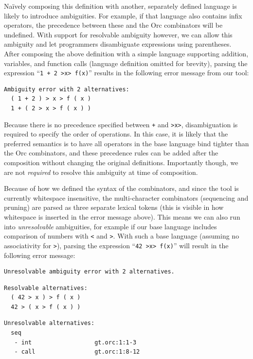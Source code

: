 \documentclass[acmsmall,review,anonymous]{acmart}\settopmatter{printfolios=true,printccs=false,printacmref=false}
\newcommand{\ocaml}{\lstinline[language={[objective]caml}]}
\begin{document}
\noindent
Na\"{i}vely composing this definition with another, separately
defined language is likely to introduce ambiguities. For example,
if that language also contains infix operators, the precedence
between these and the Orc combinators will be undefined. With
support for resolvable ambiguity however, we can allow this
ambiguity and let programmers disambiguate expressions using
parentheses. After composing the above definition with a simple
language supporting addition, variables, and function calls
(language definition omitted for brevity), parsing the expression
%
``\ocaml{1 + 2 >x> f(x)}''
%
results in the following error message from our tool:

{\small
\begin{lstlisting}[language={[objective]caml}]
Ambiguity error with 2 alternatives:
  ( 1 + 2 ) > x > f ( x )
  1 + ( 2 > x > f ( x ) )
\end{lstlisting}
}

\noindent
Because there is no precedence specified between \ocaml{+} and
\ocaml{>x>}, disambiguation is required to specify the order of
operations.
%
In this case, it is likely that the preferred semantics is to have
all operators in the base language bind tighter than the Orc
combinators, and these precedence rules can be added after the
composition without changing the original definitions. Importantly
though, we are not \emph{required} to resolve this ambiguity at
time of composition.

Because of how we defined the syntax of the combinators, and since
the tool is currently whitespace insensitive, the
multi-character combinators (sequencing and pruning) are parsed as
three separate lexical tokens (this is visible in how whitespace
is inserted in the error message above). This means we can also
run into \emph{unresolvable} ambiguities, for example if our base
language includes comparison of numbers with \ocaml{<} and
\ocaml{>}. With such a base language (assuming no associativity
for \ocaml{>}), parsing the expression
%
``\ocaml{42 >x> f(x)}''
%
will result in the following error message:

{\small
\begin{lstlisting}[language={[objective]caml}]
Unresolvable ambiguity error with 2 alternatives.
\end{lstlisting}

\begin{minipage}{.3\textwidth}
\begin{lstlisting}[language={[objective]caml}]
Resolvable alternatives:
  ( 42 > x ) > f ( x )
  42 > ( x > f ( x ) )
\end{lstlisting}
\end{minipage}
\hfill
\begin{minipage}{.5\textwidth}
\begin{lstlisting}[language={[objective]caml}]
Unresolvable alternatives:
  seq
   - int                  gt.orc:1:1-3
   - call                 gt.orc:1:8-12
\end{lstlisting}
\end{minipage}
}
\end{document}
